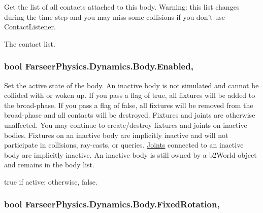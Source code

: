 Get the list of all contacts attached to this body. Warning\+: this list changes during the time step and you may miss some collisions if you don't use Contact\+Listener. 

The contact list.\hypertarget{class_farseer_physics_1_1_dynamics_1_1_body_a4e0a0f5f740db974471702e881371909}{
\subsubsection[{Enabled}]{\setlength{\rightskip}{0pt plus 5cm}bool Farseer\+Physics.\+Dynamics.\+Body.\+Enabled\hspace{0.3cm}{\ttfamily [get]}, {\ttfamily [set]}}}\label{class_farseer_physics_1_1_dynamics_1_1_body_a4e0a0f5f740db974471702e881371909}


Set the active state of the body. An inactive body is not simulated and cannot be collided with or woken up. If you pass a flag of true, all fixtures will be added to the broad-\/phase. If you pass a flag of false, all fixtures will be removed from the broad-\/phase and all contacts will be destroyed. Fixtures and joints are otherwise unaffected. You may continue to create/destroy fixtures and joints on inactive bodies. Fixtures on an inactive body are implicitly inactive and will not participate in collisions, ray-\/casts, or queries. \hyperlink{namespace_farseer_physics_1_1_dynamics_1_1_joints}{Joints} connected to an inactive body are implicitly inactive. An inactive body is still owned by a b2\+World object and remains in the body list. 

{\ttfamily true} if active; otherwise, {\ttfamily false}.\hypertarget{class_farseer_physics_1_1_dynamics_1_1_body_ad4f25a8227521e9c48643baaa1744dd4}{
\subsubsection[{Fixed\+Rotation}]{\setlength{\rightskip}{0pt plus 5cm}bool Farseer\+Physics.\+Dynamics.\+Body.\+Fixed\+Rotation\hspace{0.3cm}{\ttfamily [get]}, {\ttfamily [set]}}}\label{class_farseer_physics_1_1_dynamics_1_1_body_ad4f25a8227521e9c48643baaa1744dd4}


